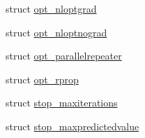 \begin{DoxyCompactItemize}
\item 
struct \hyperlink{structlimbo_1_1defaults_1_1opt__nloptgrad}{opt\+\_\+nloptgrad}
\item 
struct \hyperlink{structlimbo_1_1defaults_1_1opt__nloptnograd}{opt\+\_\+nloptnograd}
\item 
struct \hyperlink{structlimbo_1_1defaults_1_1opt__parallelrepeater}{opt\+\_\+parallelrepeater}
\item 
struct \hyperlink{structlimbo_1_1defaults_1_1opt__rprop}{opt\+\_\+rprop}
\item 
struct \hyperlink{structlimbo_1_1defaults_1_1stop__maxiterations}{stop\+\_\+maxiterations}
\item 
struct \hyperlink{structlimbo_1_1defaults_1_1stop__maxpredictedvalue}{stop\+\_\+maxpredictedvalue}
\end{DoxyCompactItemize}
